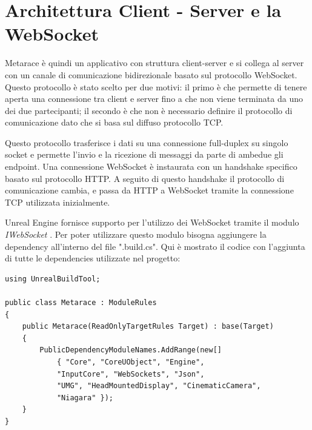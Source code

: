 


\section{Architettura Client - Server e la WebSocket}

Metarace è quindi un applicativo con struttura client-server e si collega al server con un canale di comunicazione bidirezionale basato sul protocollo WebSocket.
%
Questo protocollo è stato scelto per due motivi: il primo è che permette di tenere aperta una connessione tra client e server fino a che non viene terminata da uno dei due partecipanti; il secondo è che non è necessario definire il protocollo di comunicazione dato che si basa sul diffuso protocollo TCP.

Questo protocollo trasferisce i dati su una connessione full-duplex su singolo socket e permette l'invio e la ricezione di messaggi da parte di ambedue gli endpoint. 
%
Una connessione WebSocket è instaurata con un handshake specifico basato sul protocollo HTTP.
%
A seguito di questo handshake il protocollo di comunicazione cambia, e passa da HTTP a WebSocket tramite la connessione TCP utilizzata inizialmente. 

Unreal Engine fornisce supporto per l'utilizzo dei WebSocket tramite il modulo \textit{IWebSocket} \cite{UWebSocket}. Per poter utilizzare questo modulo bisogna aggiungere la dependency all'interno del file ".build.cs". Qui è mostrato il codice con l'aggiunta di tutte le dependencies utilizzate nel progetto:

\begin{lstlisting}[caption = Metarace.build.cs file]
using UnrealBuildTool;

public class Metarace : ModuleRules
{
	public Metarace(ReadOnlyTargetRules Target) : base(Target)
	{
		PublicDependencyModuleNames.AddRange(new[]
			{ "Core", "CoreUObject", "Engine", 
            "InputCore", "WebSockets", "Json", 
            "UMG", "HeadMountedDisplay", "CinematicCamera", 
            "Niagara" });
	}
}
\end{lstlisting}

